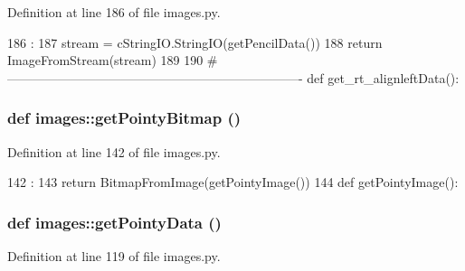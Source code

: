 Definition at line 186 of file images.py.


\begin{DoxyCode}
186                     :
187     stream = cStringIO.StringIO(getPencilData())
188     return ImageFromStream(stream)
189 
190 #----------------------------------------------------------------------
def get_rt_alignleftData():
\end{DoxyCode}
\hypertarget{namespaceimages_a56802044bb7c293a25f86af65b775b6f}{
\subsubsection[{getPointyBitmap}]{\setlength{\rightskip}{0pt plus 5cm}def images::getPointyBitmap ()}}
\label{namespaceimages_a56802044bb7c293a25f86af65b775b6f}


Definition at line 142 of file images.py.


\begin{DoxyCode}
142                      :
143     return BitmapFromImage(getPointyImage())
144 
def getPointyImage():
\end{DoxyCode}
\hypertarget{namespaceimages_a6653046ebbadde8dea28f38e51828a3a}{
\subsubsection[{getPointyData}]{\setlength{\rightskip}{0pt plus 5cm}def images::getPointyData ()}}
\label{namespaceimages_a6653046ebbadde8dea28f38e51828a3a}


Definition at line 119 of file images.py.


